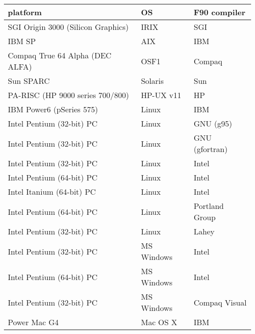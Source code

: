 \documentclass[12pt]{book}
\begin{document}
\begin{table}[htb]
\begin{tabular}{|l|l|l|}
\hline
{\bf platform} & {\bf OS} & {\bf F90 compiler} \\
\hline
SGI Origin 3000 (Silicon Graphics)  & IRIX        & SGI \\
IBM SP                              & AIX         & IBM \\
Compaq True 64 Alpha (DEC ALFA)     & OSF1        & Compaq \\
Sun SPARC                           & Solaris     & Sun \\
PA-RISC (HP 9000 series 700/800)    & HP-UX v11   & HP \\
IBM Power6 (pSeries 575)            & Linux       & IBM \\
Intel Pentium (32-bit) PC           & Linux       & GNU (g95) \\
Intel Pentium (32-bit) PC           & Linux       & GNU (gfortran) \\
Intel Pentium (32-bit) PC           & Linux       & Intel \\
Intel Pentium (64-bit) PC           & Linux       & Intel \\
Intel Itanium (64-bit) PC           & Linux       & Intel \\
Intel Pentium (64-bit) PC           & Linux       & Portland Group \\
Intel Pentium (32-bit) PC           & Linux       & Lahey \\
Intel Pentium (32-bit) PC           & MS Windows  & Intel \\
Intel Pentium (64-bit) PC           & MS Windows  & Intel \\
Intel Pentium (32-bit) PC           & MS Windows  & Compaq Visual \\
Power Mac G4                        & Mac OS X    & IBM \\
\hline
\end{tabular}
\end{table}
\end{document}
